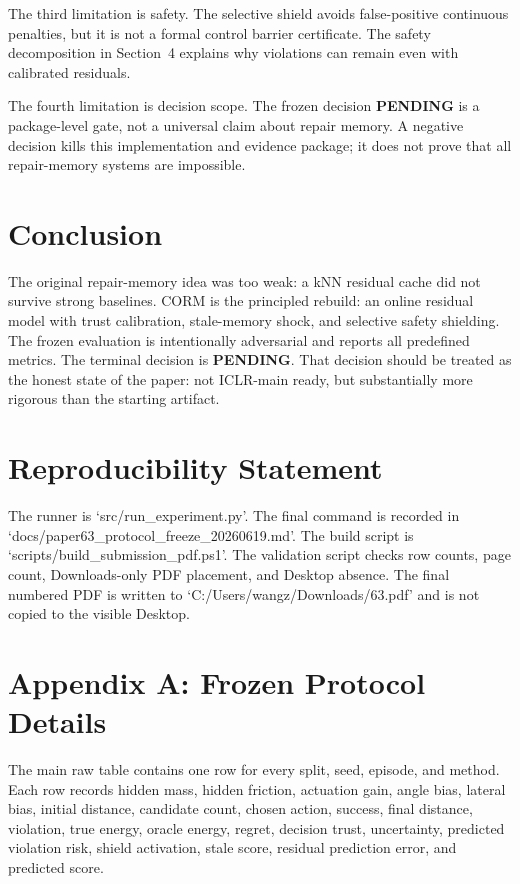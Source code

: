 \documentclass{article}
\newcommand{\TerminalDecision}{PENDING}
\begin{document}
The third limitation is safety. The selective shield avoids false-positive continuous penalties, but it is not a formal control barrier certificate. The safety decomposition in Section~4 explains why violations can remain even with calibrated residuals.

The fourth limitation is decision scope. The frozen decision \textbf{\TerminalDecision} is a package-level gate, not a universal claim about repair memory. A negative decision kills this implementation and evidence package; it does not prove that all repair-memory systems are impossible.

\section{Conclusion}

The original repair-memory idea was too weak: a kNN residual cache did not survive strong baselines. CORM is the principled rebuild: an online residual model with trust calibration, stale-memory shock, and selective safety shielding. The frozen evaluation is intentionally adversarial and reports all predefined metrics. The terminal decision is \textbf{\TerminalDecision}. That decision should be treated as the honest state of the paper: not ICLR-main ready, but substantially more rigorous than the starting artifact.

\clearpage
\section*{Reproducibility Statement}

The runner is `src/run\_experiment.py'. The final command is recorded in `docs/paper63\_protocol\_freeze\_20260619.md'. The build script is `scripts/build\_submission\_pdf.ps1'. The validation script checks row counts, page count, Downloads-only PDF placement, and Desktop absence. The final numbered PDF is written to `C:/Users/wangz/Downloads/63.pdf' and is not copied to the visible Desktop.

\section*{Appendix A: Frozen Protocol Details}

The main raw table contains one row for every split, seed, episode, and method. Each row records hidden mass, hidden friction, actuation gain, angle bias, lateral bias, initial distance, candidate count, chosen action, success, final distance, violation, true energy, oracle energy, regret, decision trust, uncertainty, predicted violation risk, shield activation, stale score, residual prediction error, and predicted score.
\end{document}
